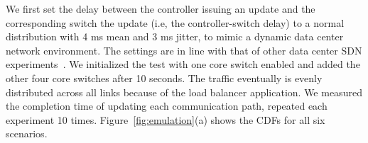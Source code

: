 
We first set the delay between the controller issuing an update and the corresponding switch  the update (i.e, the controller-switch delay) to a normal distribution with 4 ms mean and 3 ms jitter, to mimic a dynamic data center network environment. The settings are in line with that of other data center SDN experiments~\cite{curtis2011devoflow, Sherwood10}. We initialized the test with one core switch enabled and added the other four core switches after 10 seconds. The traffic eventually is evenly distributed across all links because of the load balancer application. We measured the completion time of updating each communication path, %
repeated each experiment 10 times.  Figure~\ref{fig:emulation}(a) shows the CDFs for all six scenarios.

